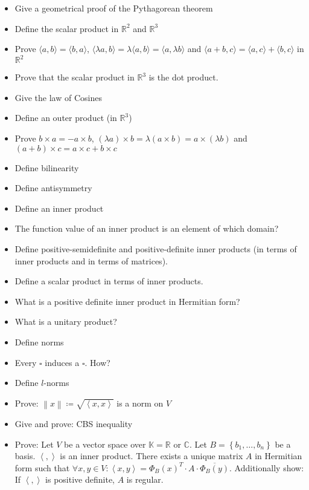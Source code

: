 \documentclass[a4paper]{article}
\newcommand{\set}[1]{\left\{#1\right\}}
\newcommand{\angel}[1]{\left\langle#1\right\rangle}
\newcommand{\norm}[1]{\left\|#1\right\|}
\begin{document}
\begin{itemize}
  \item Give a geometrical proof of the Pythagorean theorem
  \item Define the scalar product in $\mathbb R^2$ and $\mathbb R^3$
  \item Prove $\langle a, b\rangle = \langle b, a\rangle$, $\langle \lambda a, b\rangle = \lambda \langle a, b\rangle = \langle a, \lambda b\rangle$ and $\langle a + b, c \rangle = \langle a, c \rangle + \langle b, c \rangle$ in $\mathbb R^2$
  \item Prove that the scalar product in $\mathbb R^3$ is the dot product.
  \item Give the law of Cosines
  \item Define an outer product (in $\mathbb R^3$)
  \item Prove $b \times a = -a \times b$, $(\lambda a) \times b = \lambda (a \times b) = a \times (\lambda b)$ and $(a + b) \times c = a \times c + b \times c$
  \item Define bilinearity
  \item Define antisymmetry
  \item Define an inner product
  \item The function value of an inner product is an element of which domain?
  \item Define positive-semidefinite and positive-definite inner products (in terms of inner products and in terms of matrices).
  \item Define a scalar product in terms of inner products.
  \item What is a positive definite inner product in Hermitian form?
  \item What is a unitary product?
  \item Define norms
  \item Every $\square{}$ induces a $\square{}$. How?
  \item Define $l$-norms
  \item Prove: $\norm{x} \coloneqq \sqrt{\angel{x, x}}$ is a norm on $V$
  \item Give and prove: CBS inequality
  \item Prove: Let $V$ be a vector space over $\mathbb K = \mathbb R$ or $\mathbb C$. Let $B = \set{b_1, \dots, b_n}$ be a basis. $\angel{,}$ is an inner product.
    There exists a unique matrix $A$ in Hermitian form such that $\forall x,y \in V: \angel{x,y} = \Phi_B(x)^T \cdot A \cdot \overline{\Phi_B(y)}$.
  	Additionally show: If $\angel{,}$ is positive definite, $A$ is regular.

\end{itemize}
\end{document}
